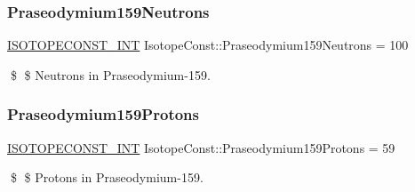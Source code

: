 \subsubsection{\texorpdfstring{Praseodymium159\+Neutrons}{Praseodymium159Neutrons}}
{\footnotesize\ttfamily \mbox{\hyperlink{group___isotope_const-_macros_ga5f18360b3e99483a35c32d789e62621c}{I\+S\+O\+T\+O\+P\+E\+C\+O\+N\+S\+T\+\_\+\+I\+NT}} Isotope\+Const\+::\+Praseodymium159\+Neutrons = 100}

\$ \$ Neutrons in Praseodymium-\/159. \mbox{\label{group___isotope_const-_praseodymium-_pr159_gaf1ce12d765e6db467384acd3fed6d4b5}} 
\subsubsection{\texorpdfstring{Praseodymium159\+Protons}{Praseodymium159Protons}}
{\footnotesize\ttfamily \mbox{\hyperlink{group___isotope_const-_macros_ga5f18360b3e99483a35c32d789e62621c}{I\+S\+O\+T\+O\+P\+E\+C\+O\+N\+S\+T\+\_\+\+I\+NT}} Isotope\+Const\+::\+Praseodymium159\+Protons = 59}

\$ \$ Protons in Praseodymium-\/159. 